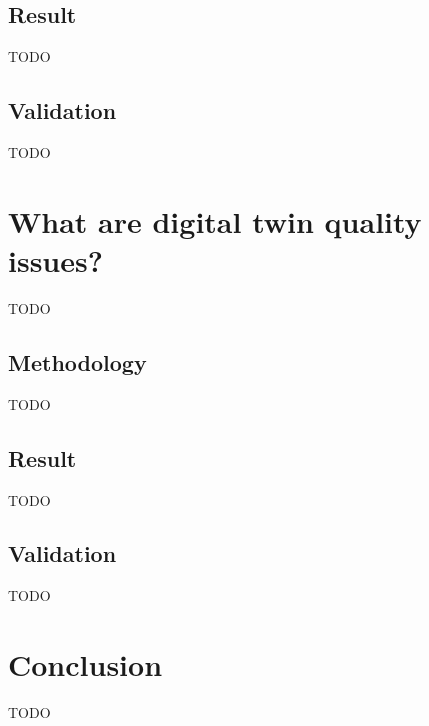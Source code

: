 \documentclass[conference]{IEEEtran}
\begin{document}
    \subsection{Result}
    TODO

    \subsection{Validation}
    TODO

    \section{What are digital twin quality issues?}
    TODO

    \subsection{Methodology}
    TODO

    \subsection{Result}
    TODO

    \subsection{Validation}
    TODO

    \section{Conclusion}
    \label{section:conclusion}
    TODO

    
    
\end{document}
